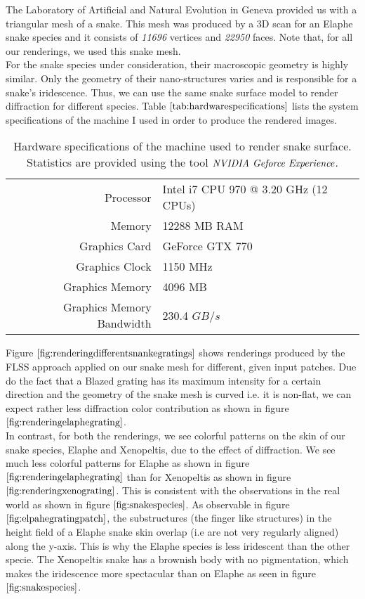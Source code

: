 The Laboratory of Artificial and Natural Evolution in Geneva provided us with a triangular mesh of a snake. This mesh was produced by a 3D scan for an Elaphe snake species and it consists of \emph{11696} vertices and \emph{22950} faces. Note that, for all our renderings, we used this snake mesh. \\

For the snake species under consideration, their macroscopic geometry is highly similar. Only the geometry of their nano-structures varies and is responsible for a snake's iridescence. Thus, we can use the same snake surface model to render diffraction for different species. Table $\ref{tab:hardwarespecifications}$ lists the system specifications of the machine I used in order to produce the rendered images.

\begin{table}[H]
  \centering
  \begin{tabular}{|r|l|}
    \hline
    Processor & Intel i7 CPU 970 @ 3.20 GHz (12 CPUs) \\
    Memory & 12288 MB RAM \\
    Graphics Card & GeForce GTX 770 \\
    Graphics Clock & 1150 MHz \\
    Graphics Memory & 4096 MB \\
    Graphics Memory Bandwidth & 230.4 $GB/s$ \\
    \hline  
  \end{tabular}
\caption[Hardware Specifications]{Hardware specifications of the machine used to render snake surface. Statistics are provided using the tool $\emph{NVIDIA Geforce Experience}$.}
\label{tab:hardwarespecifications}
\end{table}

Figure $\ref{fig:renderingdifferentsnankegratings}$ shows renderings produced by the FLSS approach applied on our snake mesh for different, given input patches. Due do the fact that a Blazed grating has its maximum intensity for a certain direction and the geometry of the snake mesh is curved i.e. it is non-flat, we can expect rather less diffraction color contribution as shown in figure $\ref{fig:renderingelaphegrating}$. \\


In contrast, for both the renderings, we see colorful patterns on the skin of our snake species, Elaphe and Xenopeltis, due to the effect of diffraction. We see much less colorful patterns for Elaphe as shown in figure $\ref{fig:renderingelaphegrating}$ than for Xenopeltis as shown in figure $\ref{fig:renderingxenograting}$. This is consistent with the observations in the real world as shown in figure $\ref{fig:snakespecies}$. As observable in figure $\ref{fig:elpahegratingpatch}$, the substructures (the finger like structures) in the height field of a Elaphe snake skin overlap (i.e are not very regularly aligned) along the y-axis. This is why the Elaphe species is less iridescent than the other specie. The Xenopeltis snake has a brownish body with no pigmentation, which makes the iridescence more spectacular than on Elaphe as seen in figure $\ref{fig:snakespecies}$. 
 
